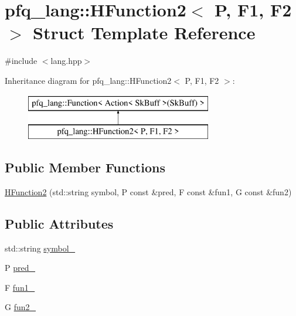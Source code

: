 \hypertarget{structpfq__lang_1_1HFunction2}{\section{pfq\+\_\+lang\+:\+:H\+Function2$<$ P, F1, F2 $>$ Struct Template Reference}
\label{structpfq__lang_1_1HFunction2}
}


{\ttfamily \#include $<$lang.\+hpp$>$}

Inheritance diagram for pfq\+\_\+lang\+:\+:H\+Function2$<$ P, F1, F2 $>$\+:\begin{figure}[H]
\begin{center}
\leavevmode
\includegraphics[height=2.000000cm]{structpfq__lang_1_1HFunction2}
\end{center}
\end{figure}
\subsection*{Public Member Functions}
\begin{DoxyCompactItemize}
\item 
\hyperlink{structpfq__lang_1_1HFunction2_a6c0b3bb60f200e7d34876b6b429ab80f}{H\+Function2} (std\+::string symbol, P const \&pred, F const \&fun1, G const \&fun2)
\end{DoxyCompactItemize}
\subsection*{Public Attributes}
\begin{DoxyCompactItemize}
\item 
std\+::string \hyperlink{structpfq__lang_1_1HFunction2_a5c354f72202e280f4e01fa033709da68}{symbol\+\_\+}
\item 
P \hyperlink{structpfq__lang_1_1HFunction2_ab1f1307df8a4b1c23cd9e2905b308679}{pred\+\_\+}
\item 
F \hyperlink{structpfq__lang_1_1HFunction2_a1e7d18cef3f4fce903509c3562369418}{fun1\+\_\+}
\item 
G \hyperlink{structpfq__lang_1_1HFunction2_a55766e7665c4a9f14f9fb5e35ca24405}{fun2\+\_\+}
\end{DoxyCompactItemize}
